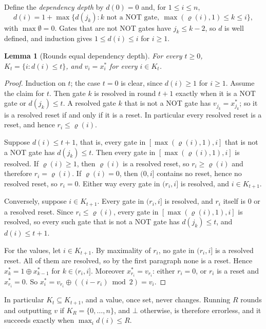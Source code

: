 \documentclass[11pt]{amsart}
\newtheorem{lemma}[theorem]{Lemma}
\theoremstyle{definition}
\theoremstyle{remark}
\begin{document}
Define the \emph{dependency depth} by $d(0)=0$ and, for $1\le i\le n$,
\begin{equation}\label{kp:eq-d}
  d(i)=1+\max\bigl\{d(j_k): k \text{ not a NOT gate},\
  \max(\varrho(i),1)\le k\le i\bigr\},
\end{equation}
with $\max\emptyset=0$. Gates that are not NOT gates have $j_k\le k-2$, so $d$
is well defined, and induction gives $1\le d(i)\le i$ for $i\ge 1$.

\begin{lemma}[Rounds equal dependency depth]\label{kp:rounds-d}
For every $t\ge 0$, $K_t=\{i: d(i)\le t\}$, and $v_i=x^*_i$ for every
$i\in K_t$.
\end{lemma}

\begin{proof}
Induction on $t$; the case $t=0$ is clear, since $d(i)\ge 1$ for $i\ge 1$.
Assume the claim for $t$. Then gate $k$ is resolved in round $t+1$ exactly when
it is a NOT gate or $d(j_k)\le t$. A resolved gate $k$ that is not a NOT gate
has $v_{j_k}=x^*_{j_k}$; so it is a resolved reset if and only if it is a
reset. In particular every resolved reset is a reset, and hence
$r_i\le\varrho(i)$.

Suppose $d(i)\le t+1$, that is, every gate in $[\max(\varrho(i),1),i]$ that is
not a NOT gate has $d(j_k)\le t$. Then every gate in $[\max(\varrho(i),1),i]$
is resolved. If $\varrho(i)\ge 1$, then $\varrho(i)$ is a resolved reset, so
$r_i\ge\varrho(i)$ and therefore $r_i=\varrho(i)$. If $\varrho(i)=0$, then
$(0,i]$ contains no reset, hence no resolved reset, so $r_i=0$. Either way every
gate in $(r_i,i]$ is resolved, and $i\in K_{t+1}$.

Conversely, suppose $i\in K_{t+1}$. Every gate in $(r_i,i]$ is resolved, and
$r_i$ itself is $0$ or a resolved reset. Since $r_i\le\varrho(i)$, every gate
in $[\max(\varrho(i),1),i]$ is resolved, so every such gate that is not a NOT
gate has $d(j_k)\le t$, and $d(i)\le t+1$.

For the values, let $i\in K_{t+1}$. By maximality of $r_i$, no gate in
$(r_i,i]$ is a resolved reset. All of them are resolved, so by the first
paragraph none is a reset. Hence $x^*_k=1\oplus x^*_{k-1}$ for $k\in(r_i,i]$.
Moreover $x^*_{r_i}=v_{r_i}$: either $r_i=0$, or $r_i$ is a reset and
$x^*_{r_i}=0$. So $x^*_i=v_{r_i}\oplus((i-r_i)\bmod 2)=v_i$.
\end{proof}

In particular $K_t\subseteq K_{t+1}$, and a value, once set, never changes.
Running $R$ rounds and outputting $v$ if $K_R=\{0,\dots,n\}$, and $\bot$
otherwise, is therefore errorless, and it succeeds exactly when
$\max_i d(i)\le R$.
\end{document}
